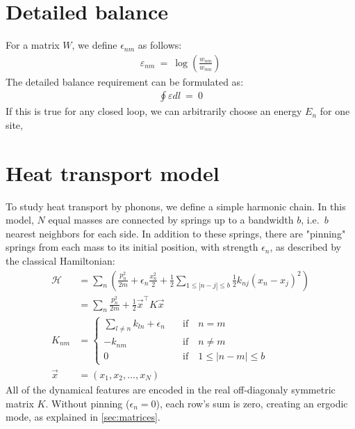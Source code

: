 \section{Detailed balance}\label{sec:detailed_balance}

For a matrix $W$, we define $\epsilon_{nm}$ as follows:
%
\begin{align}
\varepsilon_{nm}\ =\ \log\left(\frac{w_{nm}}{w_{mn}}\right)
\end{align}
%
The detailed balance requirement can be formulated as:
%
\begin{align}
\oint \varepsilon dl \ =\ 0
\end{align}
%
If this is true for any closed loop, we can
arbitrarily choose an energy $E_n$ for one site,



\section{Heat transport model}\label{sec:app_heat}

To study heat transport by phonons, we define a simple harmonic chain.
In this model, $N$ equal masses are connected by springs 
up to a bandwidth $b$, i.e.\ $b$ nearest neighbors for each side. 
In addition to these springs, there are "pinning" springs from each
mass to its initial position, with
strength $\epsilon_n$, as described by the classical Hamiltonian:
%
\begin{align}
\mathcal{H} &= \sum_n \left( \frac{p_n^2}{2m} +\epsilon_n\frac{x_n^2}{2}+ \frac{1}{2}\sum_{1\le |n-j|\le b} \frac{1}{2}k_{nj} (x_n-x_j)^2 \right) \\
            &= \sum_{n} \frac{p_n^2}{2m} +  \frac{1}{2}\vec{x}^{\intercal} K \vec{x} \\
            K_{nm} &= \begin{cases} 
            \sum_{l\ne n} k_{ln} +\epsilon_n \quad &\textrm{if}\quad n=m \label{eq:K_matrix}\\ 
            - k_{nm}  \quad &\textrm{if}\quad n\ne m \\
            0 \quad &\textrm{if}\quad 1\le |n-m|\le b
            \end{cases}\\
            \vec{x} &= (x_1,x_2,\ldots,x_N)
\end{align}
%
All of the dynamical features are encoded in the real off-diagonaly symmetric matrix $K$.
Without pinning ($\epsilon_n=0$), each row's sum is zero,
creating an ergodic mode, as explained in \autoref{sec:matrices}.



